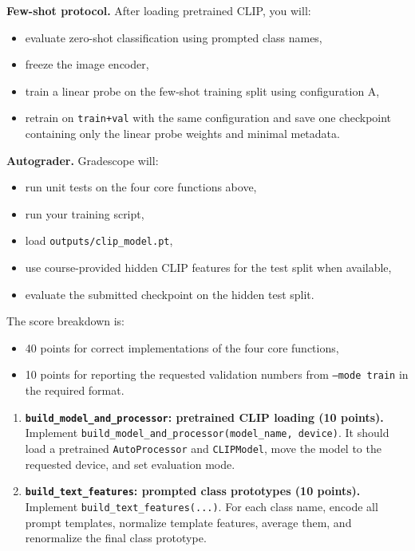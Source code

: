 \begin{Q}
\medskip
\noindent\textbf{Few-shot protocol.}
After loading pretrained CLIP, you will:
\begin{itemize}
\item evaluate zero-shot classification using prompted class names,
\item freeze the image encoder,
\item train a linear probe on the few-shot training split using configuration A,
\item retrain on \texttt{train+val} with the same configuration and save one checkpoint containing only the linear probe weights and minimal metadata.
\end{itemize}

\medskip
\noindent\textbf{Autograder.}
Gradescope will:
\begin{itemize}
\item run unit tests on the four core functions above,
\item run your training script,
\item load \texttt{outputs/clip\_model.pt},
\item use course-provided hidden CLIP features for the test split when available,
\item evaluate the submitted checkpoint on the hidden test split.
\end{itemize}
The score breakdown is:
\begin{itemize}
\item 40 points for correct implementations of the four core functions,
\item 10 points for reporting the requested validation numbers from \texttt{--mode train} in the required format.
\end{itemize}

\begin{enumerate}

\item \textbf{\texttt{build\_model\_and\_processor}: pretrained CLIP loading (10 points).}\\
Implement \texttt{build\_model\_and\_processor(model\_name, device)}.
It should load a pretrained \texttt{AutoProcessor} and \texttt{CLIPModel}, move the model to the requested device, and set evaluation mode.

\item \textbf{\texttt{build\_text\_features}: prompted class prototypes (10 points).} \\
Implement \texttt{build\_text\_features(...)}.
For each class name, encode all prompt templates, normalize template features, average them, and renormalize the final class prototype.


\end{enumerate}
\end{Q}
